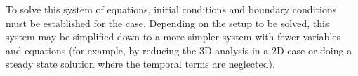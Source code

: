 To solve this system of equations, initial conditions and boundary conditions must be established for the case. Depending on the setup to be solved, this system may be simplified down to a more simpler system with fewer variables and equations (for example, by reducing the 3D analysis in a 2D case or doing a steady state solution where the temporal terms are neglected).
